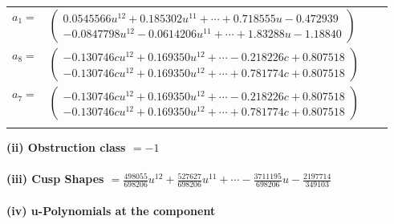 \documentclass[1p]{elsarticle_modified}
\theoremstyle{definition}
\begin{document}
\begin{tabular}{m{7pt} m{180pt} m{7pt} m{180pt} }
\flushright $a_{1}=$&$\begin{pmatrix}0.0545566 u^{12}+0.185302 u^{11}+\cdots+0.718555 u-0.472939\\-0.0847798 u^{12}-0.0614206 u^{11}+\cdots+1.83288 u-1.18840\end{pmatrix}$ \\
\flushright $a_{8}=$&$\begin{pmatrix}-0.130746 c u^{12}+0.169350 u^{12}+\cdots-0.218226 c+0.807518\\-0.130746 c u^{12}+0.169350 u^{12}+\cdots+0.781774 c+0.807518\end{pmatrix}$ \\
\flushright $a_{7}=$&$\begin{pmatrix}-0.130746 c u^{12}+0.169350 u^{12}+\cdots-0.218226 c+0.807518\\-0.130746 c u^{12}+0.169350 u^{12}+\cdots+0.781774 c+0.807518\end{pmatrix}$\\&\end{tabular}
\flushleft \textbf{(ii) Obstruction class $= -1$}\\~\\
\flushleft \textbf{(iii) Cusp Shapes $= \frac{498055}{698206} u^{12}+\frac{527627}{698206} u^{11}+\cdots-\frac{3711195}{698206} u-\frac{2197714}{349103}$}\\~\\
\newpage\renewcommand{\arraystretch}{1}
\flushleft \textbf{(iv) u-Polynomials at the component}\newline \\
\end{document}
